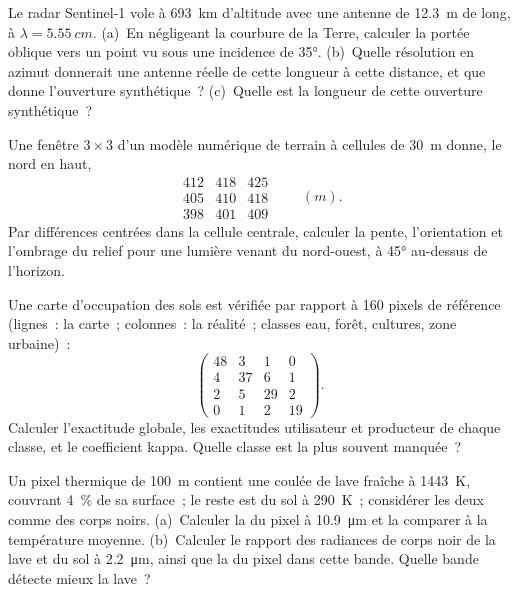 \begin{exercise}[$\star\star$]\label{exo:b3:remote-sensing-gis:6}
Le radar Sentinel-1 vole à \qty{693}{km} d'altitude avec une antenne de \qty{12.3}{m}
de long, à $\lambda = \qty{5.55}{cm}$. (a)~En négligeant la courbure de la
Terre, calculer la portée oblique vers un point vu sous une incidence de
\ang{35}. (b)~Quelle résolution en azimut donnerait une antenne réelle de cette longueur
à cette distance, et que donne l'ouverture synthétique~? (c)~Quelle est la
longueur de cette ouverture synthétique~?
\end{exercise}

\begin{exercise}[$\star\star$]\label{exo:b3:remote-sensing-gis:7}
Une fenêtre $3\times3$ d'un modèle numérique de terrain à cellules de \qty{30}{m}
donne, le nord en haut,
\[
\begin{matrix} 412 & 418 & 425 \\ 405 & 410 & 418 \\ 398 & 401 & 409 \end{matrix}
\qquad (\unit{m}).
\]
Par différences centrées dans la cellule centrale, calculer la pente, l'orientation
et l'ombrage du relief pour une lumière venant du nord-ouest, à \ang{45} au-dessus de
l'horizon.
\end{exercise}

\begin{exercise}[$\star\star$]\label{exo:b3:remote-sensing-gis:8}
Une carte d'occupation des sols est vérifiée par rapport à 160 pixels de référence (lignes~: la carte~;
colonnes~: la réalité~; classes eau, forêt, cultures, zone urbaine)~:
\[
\begin{pmatrix} 48 & 3 & 1 & 0 \\ 4 & 37 & 6 & 1 \\ 2 & 5 & 29 & 2 \\ 0 & 1 & 2 & 19 \end{pmatrix} .
\]
Calculer l'exactitude globale, les exactitudes utilisateur et producteur de chaque
classe, et le coefficient kappa. Quelle classe est la plus souvent manquée~?
\end{exercise}

\begin{exercise}[$\star\star$]\label{exo:b3:remote-sensing-gis:9}
Un pixel thermique de \qty{100}{m} contient une coulée de lave fraîche à \qty{1443}{K},
couvrant \qty{4}{\percent} de sa surface~; le reste est du sol à \qty{290}{K}~; considérer
les deux comme des corps noirs. (a)~Calculer la  du pixel
à \qty{10.9}{\micro\metre} et la comparer à la température moyenne.
(b)~Calculer le rapport des radiances de corps noir de la lave et du
sol à \qty{2.2}{\micro\metre}, ainsi que la  du
pixel dans cette bande. Quelle bande détecte mieux la lave~?
\end{exercise}

